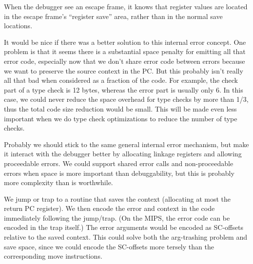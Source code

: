 When the debugger see an escape frame, it knows that register values are
located in the escape frame's ``register save'' area, rather than in the normal
save locations.

It would be nice if there was a better solution to this internal error concept.
One problem is that it seems there is a substantial space penalty for emitting
all that error code, especially now that we don't share error code between
errors because we want to preserve the source context in the PC.  But this
probably isn't really all that bad when considered as a fraction of the code.
For example, the check part of a type check is 12 bytes, whereas the error part
is usually only 6.  In this case, we could never reduce the space overhead for
type checks by more than 1/3, thus the total code size reduction would be
small.  This will be made even less important when we do type check
optimizations to reduce the number of type checks.

Probably we should stick to the same general internal error mechanism, but make
it interact with the debugger better by allocating linkage registers and
allowing proceedable errors.  We could support shared error calls and
non-proceedable errors when space is more important than debuggability, but
this is probably more complexity than is worthwhile.

We jump or trap to a routine that saves the context (allocating at most the
return PC register).  We then encode the error and context in the code
immediately following the jump/trap.  (On the MIPS, the error code can be
encoded in the trap itself.)  The error arguments would be encoded as
SC-offsets relative to the saved context.  This could solve both the
arg-trashing problem and save space, since we could encode the SC-offsets more
tersely than the corresponding move instructions.
